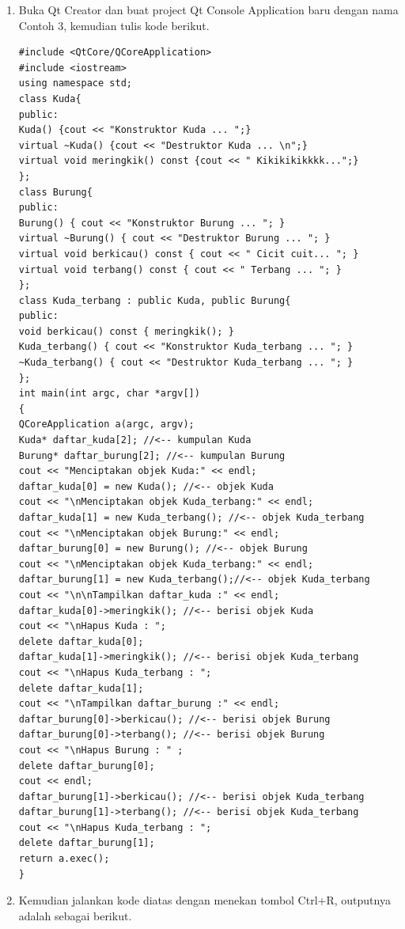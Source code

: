 \begin{enumerate}
\def\labelenumi{\arabic{enumi}.}
\item
  Buka Qt Creator dan buat project Qt Console Application baru dengan
  nama Contoh 3, kemudian tulis kode berikut.

\begin{verbatim}
#include <QtCore/QCoreApplication>
#include <iostream>
using namespace std;
class Kuda{
public:
Kuda() {cout << "Konstruktor Kuda ... ";}
virtual ~Kuda() {cout << "Destruktor Kuda ... \n";}
virtual void meringkik() const {cout << " Kikikikikkkk...";}
};
class Burung{
public:
Burung() { cout << "Konstruktor Burung ... "; }
virtual ~Burung() { cout << "Destruktor Burung ... "; }
virtual void berkicau() const { cout << " Cicit cuit... "; }
virtual void terbang() const { cout << " Terbang ... "; }
};
class Kuda_terbang : public Kuda, public Burung{
public:
void berkicau() const { meringkik(); }
Kuda_terbang() { cout << "Konstruktor Kuda_terbang ... "; }
~Kuda_terbang() { cout << "Destruktor Kuda_terbang ... "; }
};
int main(int argc, char *argv[])
{
QCoreApplication a(argc, argv);
Kuda* daftar_kuda[2]; //<-- kumpulan Kuda
Burung* daftar_burung[2]; //<-- kumpulan Burung
cout << "Menciptakan objek Kuda:" << endl;
daftar_kuda[0] = new Kuda(); //<-- objek Kuda
cout << "\nMenciptakan objek Kuda_terbang:" << endl;
daftar_kuda[1] = new Kuda_terbang(); //<-- objek Kuda_terbang
cout << "\nMenciptakan objek Burung:" << endl;
daftar_burung[0] = new Burung(); //<-- objek Burung
cout << "\nMenciptakan objek Kuda_terbang:" << endl;
daftar_burung[1] = new Kuda_terbang();//<-- objek Kuda_terbang
cout << "\n\nTampilkan daftar_kuda :" << endl;
daftar_kuda[0]->meringkik(); //<-- berisi objek Kuda
cout << "\nHapus Kuda : ";
delete daftar_kuda[0];
daftar_kuda[1]->meringkik(); //<-- berisi objek Kuda_terbang
cout << "\nHapus Kuda_terbang : ";
delete daftar_kuda[1];
cout << "\nTampilkan daftar_burung :" << endl;
daftar_burung[0]->berkicau(); //<-- berisi objek Burung
daftar_burung[0]->terbang(); //<-- berisi objek Burung
cout << "\nHapus Burung : " ;
delete daftar_burung[0];
cout << endl;
daftar_burung[1]->berkicau(); //<-- berisi objek Kuda_terbang
daftar_burung[1]->terbang(); //<-- berisi objek Kuda_terbang
cout << "\nHapus Kuda_terbang : ";
delete daftar_burung[1];
return a.exec();
}
\end{verbatim}
\item
  Kemudian jalankan kode diatas dengan menekan tombol Ctrl+R, outputnya
  adalah sebagai berikut.
\end{enumerate}

